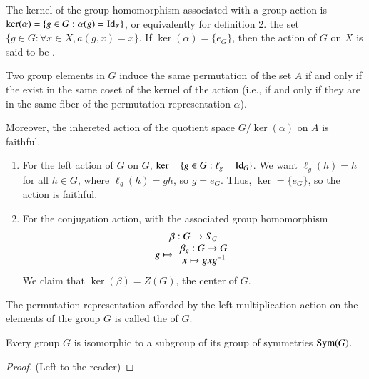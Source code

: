 \begin{definition}
        The kernel of the group homomorphism associated with a group action is $\ker(\alpha) = \{g \in G:\alpha(g) = \operatorname{Id}_X\}$, or equivalently for definition 2. the set $\{g \in G: \forall x \in X, a(g,x) = x\}$. If $\ker(\alpha) = \{e_G\}$, then the action of $G$ on $X$ is said to be .
\end{definition}

\begin{remark}
    Two group elements in $G$ induce the same permutation of the set $A$ if and only if the exist in the same coset of the kernel of the action (i.e., if and only if they are in the same fiber of the permutation representation $\alpha$).


    Moreover, the inhereted action of the quotient space $G/\ker(\alpha)$ on $A$ is faithful.
\end{remark}


\begin{example}
        \leavevmode
        \begin{enumerate}
                \item For the left action of $G$ on $G$, $\ker = \{g \in G: \ell_g = \operatorname{Id}_G\}$. We want $\ell_g(h) = h$ for all $h \in G$, where $\ell_g(h) = gh$, so $g = e_G$. Thus, $\ker = \{e_G\}$, so the action is faithful.
                \item For the conjugation action, with the associated group homomorphism \begin{equation}
                                \begin{array}{c} \beta:G\rightarrow S_G \\ g\mapsto\begin{array}{c} \beta_g:G\rightarrow G \\ x\mapsto gxg^{-1} \end{array} \end{array}
                        \end{equation}
                        We claim that $\ker(\beta) = Z(G)$, the center of $G$.
        \end{enumerate}
\end{example}


\begin{definition}
    The permutation representation afforded by the left multiplication action on the elements of the group $G$ is called the  of $G$.
\end{definition}

\begin{theorem}
        Every group $G$ is isomorphic to a subgroup of its group of symmetries $\operatorname{Sym}(G)$.
\end{theorem}
\begin{proof}
        (Left to the reader)
\end{proof}


